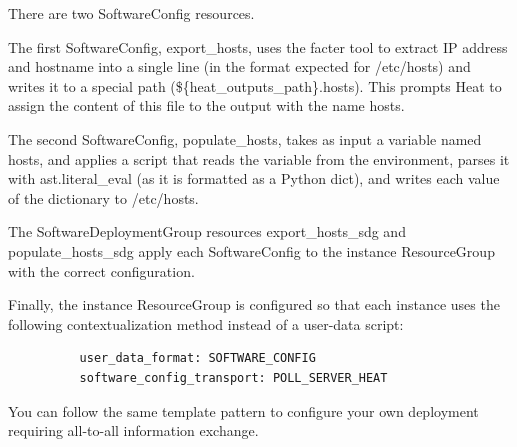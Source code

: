 There are two SoftwareConfig resources.

The first SoftwareConfig, export\_hosts, uses the facter tool to extract
IP address and hostname into a single line (in the format expected for
/etc/hosts) and writes it to a special path
(\$\{heat\_outputs\_path\}.hosts). This prompts Heat to assign the
content of this file to the output with the name hosts.

The second SoftwareConfig, populate\_hosts, takes as input a variable
named hosts, and applies a script that reads the variable from the
environment, parses it with ast.literal\_eval (as it is formatted as a
Python dict), and writes each value of the dictionary to /etc/hosts.

The SoftwareDeploymentGroup resources export\_hosts\_sdg and
populate\_hosts\_sdg apply each SoftwareConfig to the instance
ResourceGroup with the correct configuration.

Finally, the instance ResourceGroup is configured so that each instance
uses the following contextualization method instead of a user-data
script:

\begin{footnotesize}
\begin{verbatim}
          user_data_format: SOFTWARE_CONFIG
          software_config_transport: POLL_SERVER_HEAT
\end{verbatim}
\end{footnotesize}

You can follow the same template pattern to configure your own
deployment requiring all-to-all information exchange.


